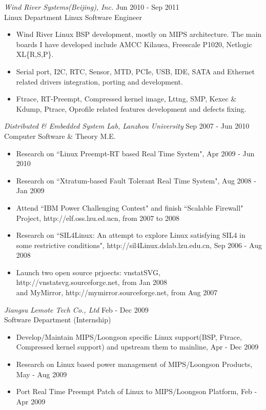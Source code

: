 \documentclass{res}
\begin{document}
\begin{resume}
{\sl Wind River Systems(Beijing), Inc. } \hfill        Jun 2010 - Sep 2011 \\
Linux Department    \hfill  Linux Software Engineer

   \begin{itemize} \itemsep -2pt %
   \item Wind River Linux BSP development, mostly on MIPS architecture. The main boards I have developed include AMCC Kilauea, Freescale P1020, Netlogic XL\{R,S,P\}.
   \item Serial port, I2C, RTC, Sensor, MTD, PCIe, USB, IDE, SATA and Ethernet related drivers integration, porting and development.
   \item Ftrace, RT-Preempt, Compressed kernel image, Lttng, SMP, Kexec \& Kdump, Ptrace, Oprofile related features development and defects fixing.
 \end{itemize}

{\sl Distributed \& Embedded System Lab, Lanzhou University} \hfill  Sep 2007 - Jun 2010 \\
Computer Software \& Theory  \hfill M.E.

   \begin{itemize} \itemsep -2pt %
   \item Research on ``Linux Preempt-RT based Real Time System", Apr 2009 - Jun 2010
   \item Research on ``Xtratum-based Fault Tolerant Real Time System", Aug 2008 - Jan 2009
   \item Attend ``IBM Power Challenging Contest" and finish ``Scalable Firewall" Project, http://elf.oss.lzu.ed.ucn, from 2007 to 2008
   \item Research on ``SIL4Linux: An attempt to explore Linux satisfying SIL4 in some restrictive conditions", http://sil4Linux.dslab.lzu.edu.cn, Sep 2006 - Aug 2008
   \item Launch two open source prjoects: vnstatSVG, http://vnstatsvg.sourceforge.net, from Jan 2008 \\ and MyMirror, http://mymirror.sourceforge.net, from Aug 2007
 \end{itemize}


{\sl Jiangsu Lemote Tech Co., Ltd } \hfill	  Feb - Dec 2009 \\
Software Department    \hfill	(Internship)

   \begin{itemize} \itemsep -2pt %
   \item Develop/Maintain MIPS/Loongson specific Linux support(BSP, Ftrace, Compressed kernel support) and upstream them to mainline, Apr - Dec 2009
   \item Research on Linux based power management of MIPS/Loongson Products, May - Aug 2009
   \item Port Real Time Preempt Patch of Linux to MIPS/Loongson Platform, Feb - Apr 2009
 \end{itemize}


\end{resume}
\end{document}
